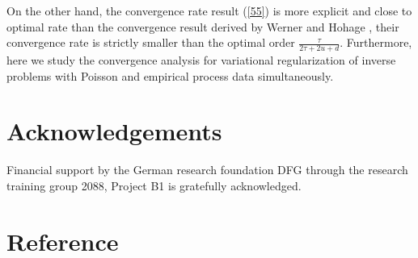 \documentclass[10pt]{iopart}
\begin{document}
On the other hand, the convergence rate result (\ref{55}) is more explicit and close to optimal rate than the convergence result derived by
Werner and Hohage \cite{Werner2012}, their convergence rate is strictly smaller than the optimal order $\frac{\tau}{2\tau+2u+d}$. Furthermore,
here we study the convergence analysis for variational regularization of inverse problems with Poisson and empirical process data simultaneously. 



\section*{Acknowledgements}
Financial support by the German research foundation DFG through the research training group 2088, Project B1 is gratefully acknowledged.


\section*{Reference}
\end{document}
